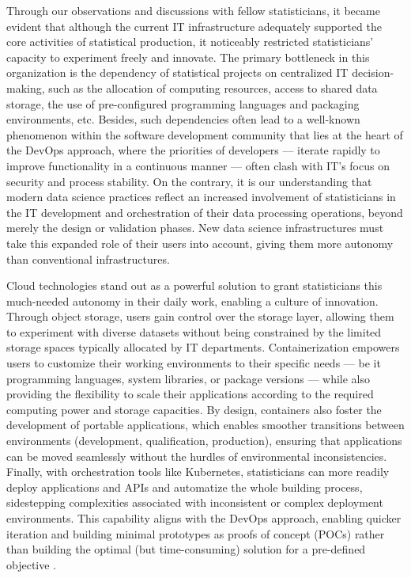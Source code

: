 Through our observations and discussions with fellow statisticians, it became evident that although the current IT infrastructure adequately supported the core activities of statistical production, it noticeably restricted statisticians' capacity to experiment freely and innovate. The primary bottleneck in this organization is the dependency of statistical projects on centralized IT decision-making, such as the allocation of computing resources, access to shared data storage, the use of pre-configured programming languages and packaging environments, etc. Besides, such dependencies often lead to a well-known phenomenon within the software development community that lies at the heart of the DevOps approach, where the priorities of developers — iterate rapidly to improve functionality in a continuous manner — often clash with IT's focus on security and process stability. On the contrary, it is our understanding that modern data science practices reflect an increased involvement of statisticians in the IT development and orchestration of their data processing operations, beyond merely the design or validation phases. New data science infrastructures must take this expanded role of their users into account, giving them more autonomy than conventional infrastructures.

Cloud technologies stand out as a powerful solution to grant statisticians this much-needed autonomy in their daily work, enabling a culture of innovation. Through object storage, users gain control over the storage layer, allowing them to experiment with diverse datasets without being constrained by the limited storage spaces typically allocated by IT departments. Containerization empowers users to customize their working environments to their specific needs — be it programming languages, system libraries, or package versions — while also providing the flexibility to scale their applications according to the required computing power and storage capacities. By design, containers also foster the development of portable applications, which enables smoother transitions between environments (development, qualification, production), ensuring that applications can be moved seamlessly without the hurdles of environmental inconsistencies. Finally, with orchestration tools like Kubernetes, statisticians can more readily deploy applications and APIs and automatize the whole building process, sidestepping complexities associated with inconsistent or complex deployment environments. This capability aligns with the DevOps approach, enabling quicker iteration and building minimal prototypes as proofs of concept (POCs) rather than building the optimal (but time-consuming) solution for a pre-defined objective \cite{leite2019survey}.

